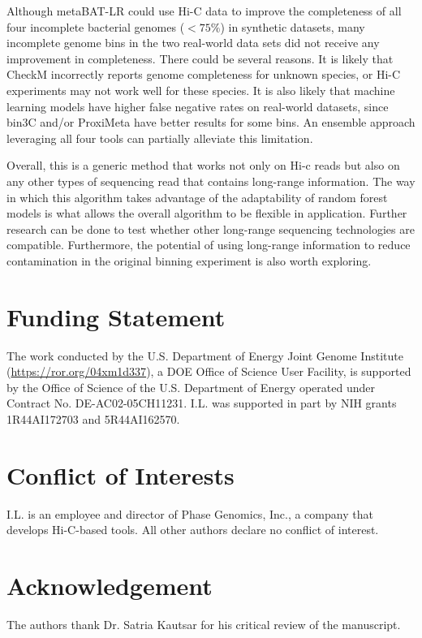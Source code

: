 \documentclass[fleqn,10pt,lineno]{wlpeerj}
\begin{document}
Although metaBAT-LR could use Hi-C data to improve the completeness of all four incomplete bacterial genomes ($<75\%$) in synthetic datasets, many incomplete genome bins in the two real-world data sets did not receive any improvement in completeness. There could be several reasons. It is likely that CheckM incorrectly reports genome completeness for unknown species, or Hi-C experiments may not work well for these species. It is also likely that machine learning models have higher false negative rates on real-world datasets, since bin3C and/or ProxiMeta have better results for some bins. An ensemble approach leveraging all four tools can partially alleviate this limitation.  

Overall, this is a generic method that works not only on Hi-c reads but also on any other types of sequencing read that contains long-range information. The way in which this algorithm takes advantage of the adaptability of random forest models is what allows the overall algorithm to be flexible in application. Further research can be done to test whether other long-range sequencing technologies are compatible. Furthermore, the potential of using long-range information to reduce contamination in the original binning experiment is also worth exploring.   

\section*{Funding Statement}
The work conducted by the U.S. Department of Energy Joint Genome Institute (\url{https://ror.org/04xm1d337}), a DOE Office of Science User Facility, is supported by the Office of Science of the U.S. Department of Energy operated under Contract No. DE-AC02-05CH11231. I.L. was supported in part by NIH grants 1R44AI172703 and 5R44AI162570.

\section*{Conflict of Interests}
I.L. is an employee and director of Phase Genomics, Inc., a company that develops Hi-C-based tools. All other authors declare no conflict of interest.

\section*{Acknowledgement}
The authors thank Dr. Satria Kautsar for his critical review of the manuscript. 


\end{document}
